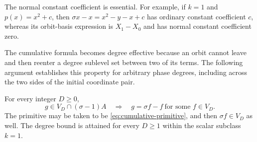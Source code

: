 The normal constant coefficient is essential.  For example, if
$k=1$ and $p(x)=x^2+c$, then
$\sigma x-x=x^2-y-x+c$ has ordinary constant coefficient $c$,
whereas its orbit-basis expression is $X_1-X_0$ and has normal
constant coefficient zero.

The cumulative formula becomes degree effective because an orbit cannot
leave and then reenter a degree sublevel set between two of its terms.
The following argument establishes this property for arbitrary phase
degrees, including across the two sides of the initial coordinate pair.

\begin{theorem}
\label{thm:bounded-primitive}
For every integer $D\ge0$,
\begin{equation}
  g\in V_D\cap(\sigma-1)A
  \quad\Longrightarrow\quad
  g=\sigma f-f\ \text{for some }f\in V_D.
  \label{eq:bounded-primitive}
\end{equation}
The primitive may be taken to be \eqref{eq:cumulative-primitive}, and
then $\sigma f\in V_D$ as well.  The degree bound is attained for
every $D\ge1$ within the scalar subclass $k=1$.
\end{theorem}

